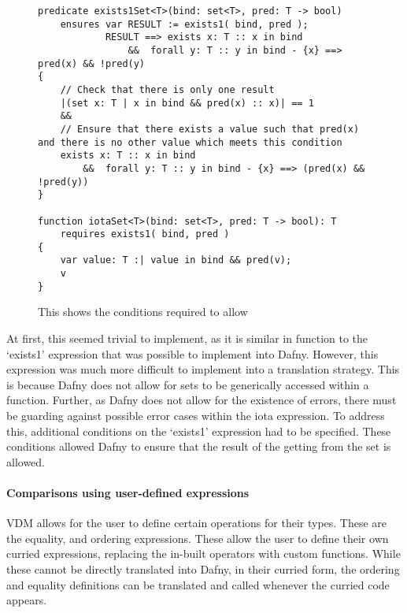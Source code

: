 \documentclass{entcs}
\begin{document}
\begin{figure}[h]
	\begin{center}
        \begin{lstlisting}[language=Dafny]
predicate exists1Set<T>(bind: set<T>, pred: T -> bool) 
    ensures var RESULT := exists1( bind, pred );
            RESULT ==> exists x: T :: x in bind 
                &&  forall y: T :: y in bind - {x} ==> pred(x) && !pred(y)
{
    // Check that there is only one result
    |(set x: T | x in bind && pred(x) :: x)| == 1
    &&
    // Ensure that there exists a value such that pred(x) and there is no other value which meets this condition
    exists x: T :: x in bind 
        &&  forall y: T :: y in bind - {x} ==> (pred(x) && !pred(y))
}

function iotaSet<T>(bind: set<T>, pred: T -> bool): T 
    requires exists1( bind, pred )
{
    var value: T :| value in bind && pred(v);
    v
}
        \end{lstlisting}
		\caption{This shows the conditions required to allow }\label{fig:iota_impl}
	\end{center}
\end{figure}

At first, this seemed trivial to implement, as it is similar in function to the `exists1' expression that was possible to implement into Dafny. However, this expression was much more difficult to implement into a translation strategy. This is because Dafny does not allow for sets to be generically accessed within a function. Further, as Dafny does not allow for the existence of errors, there must be guarding against possible error cases within the iota expression. To address this, additional conditions on the `exists1' expression had to be specified. These conditions allowed Dafny to ensure that the result of the getting from the set is allowed.

\paragraph{Comparisons using user-defined expressions}

VDM allows for the user to define certain operations for their types. These are the equality, and ordering expressions. These allow the user to define their own curried expressions, replacing the in-built operators with custom functions. While these cannot be directly translated into Dafny, in their curried form, the ordering and equality definitions can be translated and called whenever the curried code appears.
\end{document}
